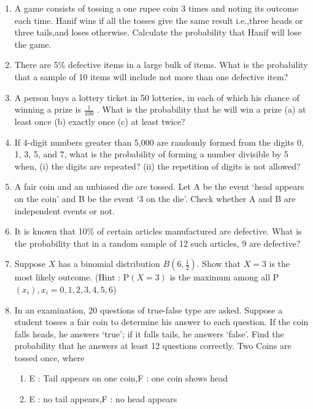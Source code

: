 \providecommand{\pr}[1]{\ensuremath{\Pr\left(#1\right)}}
\providecommand{\brak}[1]{\ensuremath{\left(#1\right)}}
\begin{enumerate}[label=\thechapter.\arabic*,ref=\thechapter.\theenumi]
\item A game consists of tossing a one rupee coin 3 times and noting its outcome each time.
 Hanif wins if all the tosses give the same result i.e.,three heads or three tails,and loses
 otherwise. Calculate the probability that Hanif will lose the game.
\item There are 5\% defective items in a large bulk of items. What is the probability
that a sample of 10 items will include not more than one defective item?
\item A person buys a lottery ticket in 50 lotteries, in each of which his chance of
winning a prize is $\frac{1}{100}$ . What is the probability that he will win a prize
(a) at least once (b) exactly once (c) at least twice?
\item If 4-digit numbers greater than 5,000 are randomly formed from the digits
0, 1, 3, 5, and 7, what is the probability of forming a number divisible by 5 when,
(i) the digits are repeated? (ii) the repetition of digits is not allowed?
\item A fair coin and an unbiased die are tossed. Let A be the event `head appears on the coin' and B be the event `3 on the die'. Check whether A and B are independent events or not.
\item It is known that 10\% of certain articles manufactured are defective. What is the probability that in a random sample of 12 such articles, 9 are defective?
\item Suppose $X$ has a binomial distribution $B\brak{6,\frac{1}{2}}$. Show that $X = 3$ is the most likely outcome. 
(Hint : P$\brak{X = 3}$ is the maximum among all P$\brak{x_i}, x_i = 0,1,2,3,4,5,6$)
\item In an examination, 20 questions of true-false type are asked. Suppose a student
	tosses a fair coin to determine his answer to each question. If the coin falls
	heads, he answers `true'; if it falls tails, he answers `false'. Find the probability
	that he answers at least 12 questions correctly.
Two Coins are tossed once, where
\begin{enumerate}
\item  E : Tail appears on one coin,\qquad F : one coin shows head
\item  E : no tail appears,\qquad\qquad\qquad F : no head appears

\end{enumerate}
\end{enumerate}
